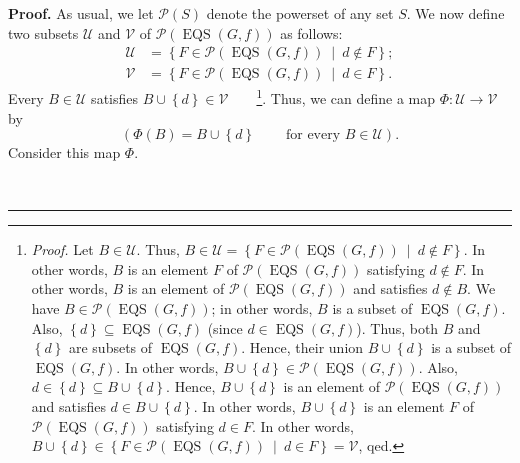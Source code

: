 \documentclass[numbers=enddot,12pt,final,onecolumn,notitlepage]{scrartcl}%
\theoremstyle{definition}
\newenvironment{proof}[1][Proof]{\noindent\textbf{#1.} }{\ \rule{0.5em}{0.5em}}
\newenvironment{verlong}{}{}
\begin{document}
\begin{proof}
\begin{verlong}
As usual, we let $\mathcal{P}\left(  S\right)  $ denote the powerset of any
set $S$. We now define two subsets $\mathcal{U}$ and $\mathcal{V}$ of
$\mathcal{P}\left(  \operatorname*{EQS}\left(  G,f\right)  \right)  $ as
follows:%
\begin{align*}
\mathcal{U}  &  =\left\{  F\in\mathcal{P}\left(  \operatorname*{EQS}\left(
G,f\right)  \right)  \ \mid\ d\notin F\right\}  ;\\
\mathcal{V}  &  =\left\{  F\in\mathcal{P}\left(  \operatorname*{EQS}\left(
G,f\right)  \right)  \ \mid\ d\in F\right\}  .
\end{align*}
Every $B\in\mathcal{U}$ satisfies $B\cup\left\{  d\right\}  \in\mathcal{V}%
$\ \ \ \ \footnote{\textit{Proof.} Let $B\in\mathcal{U}$. Thus, $B\in
\mathcal{U}=\left\{  F\in\mathcal{P}\left(  \operatorname*{EQS}\left(
G,f\right)  \right)  \ \mid\ d\notin F\right\}  $. In other words, $B$ is an
element $F$ of $\mathcal{P}\left(  \operatorname*{EQS}\left(  G,f\right)
\right)  $ satisfying $d\notin F$. In other words, $B$ is an element of
$\mathcal{P}\left(  \operatorname*{EQS}\left(  G,f\right)  \right)  $ and
satisfies $d\notin B$. We have $B\in\mathcal{P}\left(  \operatorname*{EQS}%
\left(  G,f\right)  \right)  $; in other words, $B$ is a subset of
$\operatorname*{EQS}\left(  G,f\right)  $. Also, $\left\{  d\right\}
\subseteq\operatorname*{EQS}\left(  G,f\right)  $ (since $d\in
\operatorname*{EQS}\left(  G,f\right)  $). Thus, both $B$ and $\left\{
d\right\}  $ are subsets of $\operatorname*{EQS}\left(  G,f\right)  $. Hence,
their union $B\cup\left\{  d\right\}  $ is a subset of $\operatorname*{EQS}%
\left(  G,f\right)  $. In other words, $B\cup\left\{  d\right\}
\in\mathcal{P}\left(  \operatorname*{EQS}\left(  G,f\right)  \right)  $. Also,
$d\in\left\{  d\right\}  \subseteq B\cup\left\{  d\right\}  $. Hence,
$B\cup\left\{  d\right\}  $ is an element of $\mathcal{P}\left(
\operatorname*{EQS}\left(  G,f\right)  \right)  $ and satisfies $d\in
B\cup\left\{  d\right\}  $. In other words, $B\cup\left\{  d\right\}  $ is an
element $F$ of $\mathcal{P}\left(  \operatorname*{EQS}\left(  G,f\right)
\right)  $ satisfying $d\in F$. In other words, $B\cup\left\{  d\right\}
\in\left\{  F\in\mathcal{P}\left(  \operatorname*{EQS}\left(  G,f\right)
\right)  \ \mid\ d\in F\right\}  =\mathcal{V}$, qed.}. Thus, we can define a
map $\Phi:\mathcal{U}\rightarrow\mathcal{V}$ by%
\[
\left(  \Phi\left(  B\right)  =B\cup\left\{  d\right\}
\ \ \ \ \ \ \ \ \ \ \text{for every }B\in\mathcal{U}\right)  .
\]
Consider this map $\Phi$.


\end{verlong}
\end{proof}
\end{document}

